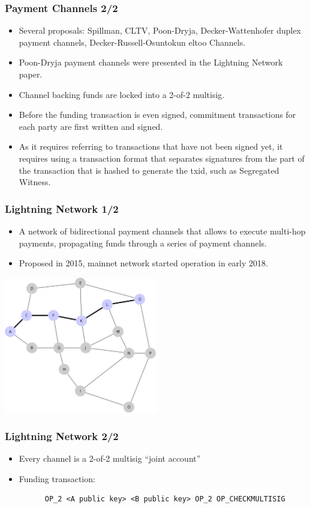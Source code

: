 \documentclass{beamer}
\begin{document}
\begin{frame}
  \frametitle{Payment Channels 2/2}
  \begin{itemize}
  \item Several proposals: Spillman, CLTV, Poon-Dryja, Decker-Wattenhofer duplex
    payment channels, Decker-Russell-Osuntokun eltoo Channels.
  \item Poon-Dryja payment channels were presented in the Lightning Network
    paper.
  \item Channel backing funds are locked into a 2-of-2 multisig.
  \item Before the funding transaction is even signed, commitment transactions
    for each party are first written and signed.
  \item As it requires referring to transactions that have not been signed yet,
    it requires using a transaction format that separates signatures from the
    part of the transaction that is hashed to generate the txid, such as
    Segregated Witness.
  \end{itemize}
\end{frame}

\begin{frame}[fragile]
  \frametitle{Lightning Network 1/2}
  \begin{itemize}
  \item A network of bidirectional payment channels that allows to execute
    multi-hop payments, propagating funds through a series of payment channels.
  \item Proposed in 2015, mainnet network started operation in early 2018.
  \end{itemize}
  \begin{center}
    \includegraphics[width=0.5\textwidth]{ln}
  \end{center}
\end{frame}

\begin{frame}[fragile]
  \frametitle{Lightning Network 2/2}
  \begin{itemize}
  \item Every channel is a 2-of-2 multisig ``joint account''
  \item Funding transaction:
    \begin{verbatim}
      OP_2 <A public key> <B public key> OP_2 OP_CHECKMULTISIG
    \end{verbatim}
  \end{itemize}
\end{frame}
\end{document}

